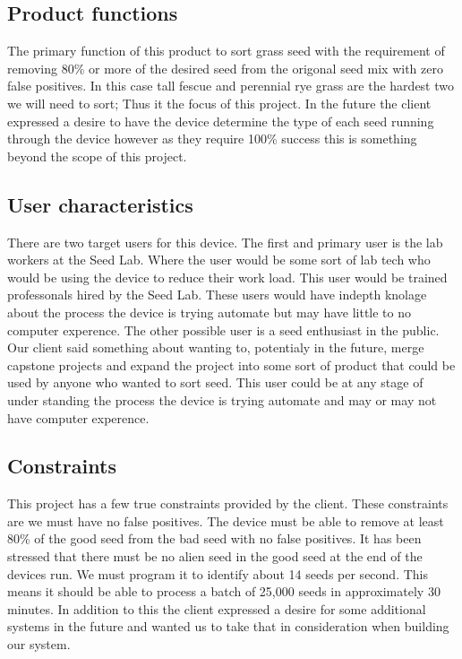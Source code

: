 \documentclass[onecolumn, draftclsnofoot,10pt, compsoc]{IEEEtran}
\begin{document}
\subsection{Product functions}
The primary function of this product to sort grass seed with the requirement of removing 80\% or more of the desired seed from the origonal seed mix with zero false positives.
In this case tall fescue and perennial rye grass are the hardest two we will need to sort; Thus it the focus of this project.
In the future the client expressed a desire to have the device determine the type of each seed running through the device however as they require 100\% success this is something beyond the scope of this project.

\subsection{User characteristics}
There are two target users for this device.
The first and primary user is the lab workers at the Seed Lab.
Where the user would be some sort of lab tech who would be using the device to reduce their work load.
This user would be trained professonals hired by the Seed Lab.
These users would have indepth knolage about the process the device is trying automate but may have little to no computer experence.
The other possible user is a seed enthusiast in the public.
Our client said something about wanting to, potentialy in the future, merge capstone projects and expand the project into some sort of product that could be used by anyone who wanted to sort seed.
This user could be at any stage of under standing the process the device is trying automate and may or may not have computer experence.

\subsection{Constraints}
This project has a few true constraints provided by the client.
These constraints are we must have no false positives.
The device must be able to remove at least 80\% of the good seed from the bad seed with no false positives.
It has been stressed that there must be no alien seed in the good seed at the end of the devices run.
We must program it to identify about 14 seeds per second.
This means it should be able to process a batch of 25,000 seeds in approximately 30 minutes.
In addition to this the client expressed a desire for some additional systems in the future and wanted us to take that in consideration when building our system.
\end{document}
